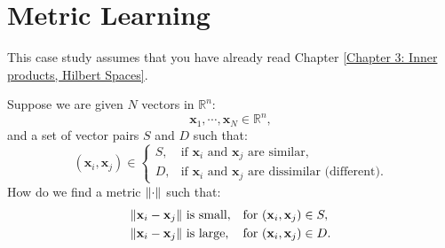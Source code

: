 \documentclass{huhtakm-template-book-v2}
\begin{document}
\chapter{Metric Learning}
    \label{Case Study C: Metric Learning}
    This case study assumes that you have already read Chapter \ref{Chapter 3: Inner products, Hilbert Spaces}.

    Suppose we are given $N$ vectors in $\mathbb{R}^{n}$:
    \begin{equation*}
        \mathbf{x}_{1},\cdots,\mathbf{x}_{N}\in\mathbb{R}^{n},
    \end{equation*}
    and a set of vector pairs $S$ and $D$ such that:
    \begin{equation*}
        (\mathbf{x}_{i},\mathbf{x}_{j})\in\begin{cases}
            S, &\text{if }\mathbf{x}_{i}\text{ and }\mathbf{x}_{j}\text{ are similar},\\
            D, &\text{if }\mathbf{x}_{i}\text{ and }\mathbf{x}_{j}\text{ are dissimilar (different)}.
        \end{cases}
    \end{equation*}
    How do we find a metric $\lVert{\cdot}\rVert$ such that:
    \begin{align*}
        \lVert{\mathbf{x}_{i}-\mathbf{x}_{j}}\rVert&\text{ is small}, & \text{for }&(\mathbf{x}_{i},\mathbf{x}_{j})\in S,\\
        \lVert{\mathbf{x}_{i}-\mathbf{x}_{j}}\rVert&\text{ is large}, & \text{for }&(\mathbf{x}_{i},\mathbf{x}_{j})\in D.
    \end{align*} 
\end{document}
